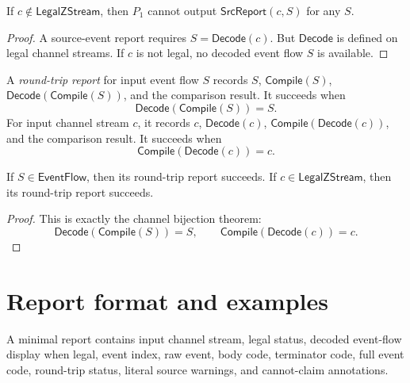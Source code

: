 \begin{proposition}
\label{prop:source-report-illegal-no-report}
If $c\notin\mathsf{LegalZStream}$, then $P_1$ cannot output $\mathsf{SrcReport}(c,S)$ for any $S$.
\end{proposition}

\begin{proof}
A source-event report requires $S=\mathsf{Decode}(c)$. But $\mathsf{Decode}$ is defined on legal channel streams. If $c$ is not legal, no decoded event flow $S$ is available.
\end{proof}

\begin{definition}
\label{def:source-report-roundtrip-report}
A \emph{round-trip report} for input event flow $S$ records $S$, $\mathsf{Compile}(S)$, $\mathsf{Decode}(\mathsf{Compile}(S))$, and the comparison result. It succeeds when
$$
  \mathsf{Decode}(\mathsf{Compile}(S))=S.
$$
For input channel stream $c$, it records $c$, $\mathsf{Decode}(c)$, $\mathsf{Compile}(\mathsf{Decode}(c))$, and the comparison result. It succeeds when
$$
  \mathsf{Compile}(\mathsf{Decode}(c))=c.
$$
\end{definition}

\begin{proposition}
\label{prop:source-report-roundtrip-determined}
If $S\in\mathsf{EventFlow}$, then its round-trip report succeeds. If $c\in\mathsf{LegalZStream}$, then its round-trip report succeeds.
\end{proposition}

\begin{proof}
This is exactly the channel bijection theorem:
$$
  \mathsf{Decode}(\mathsf{Compile}(S))=S,
  \qquad
  \mathsf{Compile}(\mathsf{Decode}(c))=c.
$$
\end{proof}

\section{Report format and examples}
\label{sec:source-report-format-examples}

\begin{definition}
\label{def:source-report-minimal-format}
A minimal report contains input channel stream, legal status, decoded event-flow display when legal, event index, raw event, body code, terminator code, full event code, round-trip status, literal source warnings, and cannot-claim annotations.
\end{definition}

